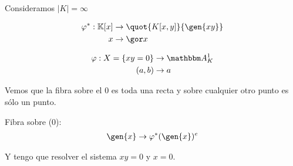 \begin{example}
	Consideramos $|K| = \infty$
	
	\begin{align*}
		\varphi^*: \K[x]& \rightarrow \quot{K[x,y]}{\gen{xy}} \\
		x & \rightarrow \cls{x}
	\end{align*}
	
	\begin{align*}
		\varphi: X=\{ xy=0  \} & \rightarrow \A^1_K \\
		(a,b) & \rightarrow a
	\end{align*}
	
	Vemos que la fibra sobre el $0$ es toda una recta  y sobre cualquier otro punto es sólo un punto.
	
	Fibra sobre (0):
	\begin{align*}
		\gen{x} & \rightarrow \varphi^*(\gen{x})^e \\
	\end{align*}
	
	Y tengo que resolver el sistema $xy=0$ y $x=0$.
\end{example}